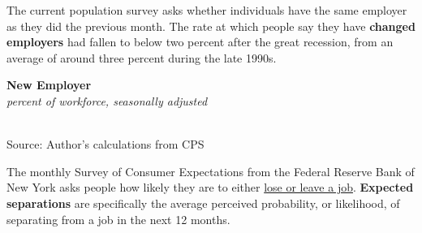 \documentclass{report}
\makeatletter
\newcommand{\tbllink}[1]{\href{https://raw.githubusercontent.com/bdecon/US-chartbook/master/chartbook/data/#1}{\faTable}}
\newcommand*\short[1]{\expandafter\@gobbletwo\number\numexpr#1\relax}
\newcommand{\dateaxisticks}{
		date coordinates in=x, axis line style={draw=none},
		xmax={2022-03-15},
		max space between ticks=40,	    
		xtick={{1990-01-01}, {1992-01-01}, {1994-01-01}, 
			{1996-01-01}, {1998-01-01}, {2000-01-01}, 
			{2002-01-01}, {2004-01-01}, {2006-01-01},
			{2008-01-01}, {2010-01-01}, {2012-01-01}, {2014-01-01},
		    {2016-01-01}, {2018-01-01}, {2020-01-01}, {2022-01-01}, 
		    {2024-01-01}, {2026-01-01}},
		minor xtick={{1989-01-01}, {1991-01-01}, {1993-01-01},
			{1995-01-01}, {1997-01-01}, {1999-01-01}, 
			{2001-01-01}, {2003-01-01}, {2005-01-01}, {2007-01-01},
		    {2009-01-01}, {2011-01-01}, {2013-01-01}, {2015-01-01},
		    {2017-01-01}, {2019-01-01}, {2021-01-01}, {2023-01-01}, 
		    {2025-01-01}, {2027-01-01}},
		enlarge y limits={0.06}, enlarge x limits={0.01},
		}
\newcommand{\stdline}[4]{\addplot[very thick, no markers, color=#1] 
		table [x=#2, y=#3, col sep=comma] {#4};	}
\newcommand{\thickline}[4]{\addplot[ultra thick, no markers, color=#1] 
		table [x=#2, y=#3, col sep=comma] {#4};	}
\newcommand{\rebars}{
		\fill[color=black!10] (axis cs:{2007-12-01},\pgfkeysvalueof{/pgfplots/ymin}) rectangle 
			(axis cs:{2009-07-01}, \pgfkeysvalueof{/pgfplots/ymax});
		\fill[color=black!10] (axis cs:{2001-03-01},\pgfkeysvalueof{/pgfplots/ymin}) rectangle 
			(axis cs:{2001-11-01}, \pgfkeysvalueof{/pgfplots/ymax});
		\fill[color=black!10] (axis cs:{2020-02-01},\pgfkeysvalueof{/pgfplots/ymin}) rectangle 
			(axis cs:{2020-05-01}, \pgfkeysvalueof{/pgfplots/ymax});}
\makeatother
\begin{document}
{{\begin{minipage}{0.76\textwidth}
The current population survey asks whether individuals have the same employer as they did the previous month. The rate at which people say they have \textbf{changed employers} had fallen to below two percent after the great recession, from an average of around three percent during the late 1990s. 

 
\vspace{1mm}

\normalsize \textbf{New Employer}\\
\footnotesize{\textit{percent of workforce, seasonally adjusted}}\\
\hspace*{-2mm} \\
\footnotesize{Source: Author's calculations from CPS} \hfill \tbllink{jobswitch.csv} 
\vspace{5mm}

\small The monthly Survey of Consumer Expectations from the Federal Reserve Bank of New York asks people how likely they are to either \href{https://www.newyorkfed.org/microeconomics/sce#/jobsep-1}{lose or leave a job}. \textbf{Expected separations} are specifically the average perceived probability, or likelihood, of separating from a job in the next 12 months. 


\end{minipage}}}
\end{document}
